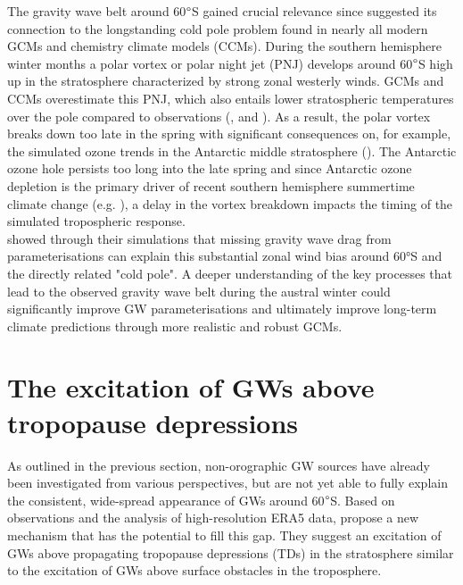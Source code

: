 The gravity wave belt around 60$\degree$S gained crucial relevance since \textcite{mclandress_is_2012} suggested its connection to the longstanding cold pole problem found in nearly all modern GCMs and chemistry climate models (CCMs). During the southern hemisphere winter months a polar vortex or polar night jet (PNJ) develops around 60$\degree$S high up in the stratosphere characterized by strong zonal westerly winds. GCMs and CCMs overestimate this PNJ, which also entails lower stratospheric temperatures over the pole compared to observations (\cite{butchart_multimodel_2011}, \cite{geller_comparison_2013} and \cite{eyring_sparc_2010}). As a result, the polar vortex breaks down too late in the spring with significant consequences on, for example, the simulated ozone trends in the Antarctic middle stratosphere (\cite{stolarski_ozone_2006}). The Antarctic ozone hole persists too long into the late spring and since Antarctic ozone depletion is the primary driver of recent southern hemisphere summertime climate change (e.g. \cite{arblaster_contributions_2006}), a delay in the vortex breakdown impacts the timing of the simulated tropospheric response. \\
\textcite{mclandress_is_2012} showed through their simulations that missing gravity wave drag from parameterisations can explain this substantial zonal wind bias around 60°S and the directly related "cold pole". A deeper understanding of the key processes that lead to the observed gravity wave belt during the austral winter could significantly improve GW parameterisations and ultimately improve long-term climate predictions through more realistic and robust GCMs. 




\section{The excitation of GWs above tropopause depressions}
\label{sec:excitation}
As outlined in the previous section, non-orographic GW sources have already been investigated from various perspectives, but are not yet able to fully explain the consistent, wide-spread appearance of GWs around 60$\degree$S. Based on observations and the analysis of high-resolution ERA5 data, \textcite{dornbrack_stratospheric_2022} propose a new mechanism that has the potential to fill this gap. They suggest an excitation of GWs above propagating tropopause depressions (TDs) in the stratosphere similar to the excitation of GWs above surface obstacles in the troposphere.


